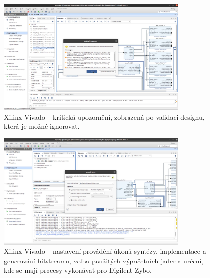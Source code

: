 \documentclass[a4paper, twoside, 11pt]{article}
\begin{document}
\begin{appendices}
		\begin{figure}[htbp!]
			\centering
			\includegraphics[width=0.85\textwidth]{src/png/zybo-xilinx-vivado-flow/zybo-xilinx-vivado-flow-24.jpg}
			\caption{Xilinx Vivado – kritická upozornění, zobrazená po validaci designu, která je možné ignorovat.}
			\label{fig:zybo-xilinx-vivado-flow-24}
		\end{figure}


		\begin{figure}[htbp!]
			\centering
			\includegraphics[width=0.85\textwidth]{src/png/zybo-xilinx-vivado-flow/zybo-xilinx-vivado-flow-29.jpg}
			\caption{Xilinx Vivado – nastavení provádění úkonů syntézy, implementace a generování bitstreamu, volba použitých výpočetních jader a určení, kde se mají procesy vykonávat pro Digilent Zybo.}
			\label{fig:zybo-xilinx-vivado-flow-29}
		\end{figure}


\end{appendices}
\end{document}
